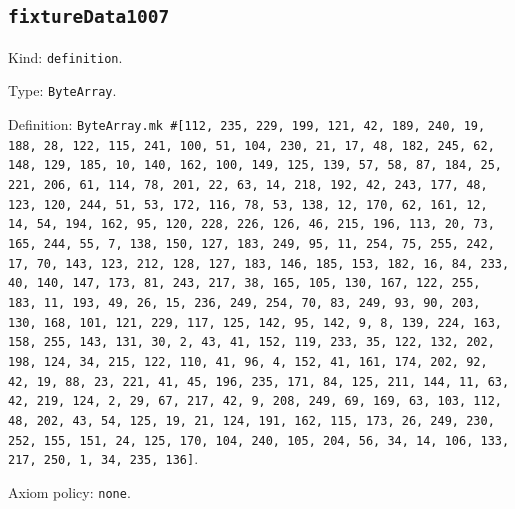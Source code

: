 \documentclass[11pt]{article}
\begin{document}
\subsection*{\texttt{fixtureData1007}}
\noindent Kind: \texttt{definition}.\par
\noindent Type: \texttt{ByteArray}.\par
\noindent Definition: \texttt{ByteArray.mk \#[112, 235, 229, 199, 121, 42, 189, 240, 19, 188, 28, 122, 115, 241, 100, 51, 104, 230, 21, 17, 48, 182, 245, 62, 148, 129, 185, 10, 140, 162, 100, 149, 125, 139, 57, 58, 87, 184, 25, 221, 206, 61, 114, 78, 201, 22, 63, 14, 218, 192, 42, 243, 177, 48, 123, 120, 244, 51, 53, 172, 116, 78, 53, 138, 12, 170, 62, 161, 12, 14, 54, 194, 162, 95, 120, 228, 226, 126, 46, 215, 196, 113, 20, 73, 165, 244, 55, 7, 138, 150, 127, 183, 249, 95, 11, 254, 75, 255, 242, 17, 70, 143, 123, 212, 128, 127, 183, 146, 185, 153, 182, 16, 84, 233, 40, 140, 147, 173, 81, 243, 217, 38, 165, 105, 130, 167, 122, 255, 183, 11, 193, 49, 26, 15, 236, 249, 254, 70, 83, 249, 93, 90, 203, 130, 168, 101, 121, 229, 117, 125, 142, 95, 142, 9, 8, 139, 224, 163, 158, 255, 143, 131, 30, 2, 43, 41, 152, 119, 233, 35, 122, 132, 202, 198, 124, 34, 215, 122, 110, 41, 96, 4, 152, 41, 161, 174, 202, 92, 42, 19, 88, 23, 221, 41, 45, 196, 235, 171, 84, 125, 211, 144, 11, 63, 42, 219, 124, 2, 29, 67, 217, 42, 9, 208, 249, 69, 169, 63, 103, 112, 48, 202, 43, 54, 125, 19, 21, 124, 191, 162, 115, 173, 26, 249, 230, 252, 155, 151, 24, 125, 170, 104, 240, 105, 204, 56, 34, 14, 106, 133, 217, 250, 1, 34, 235, 136]}.\par
\noindent Axiom policy: \texttt{none}.\par
\end{document}
